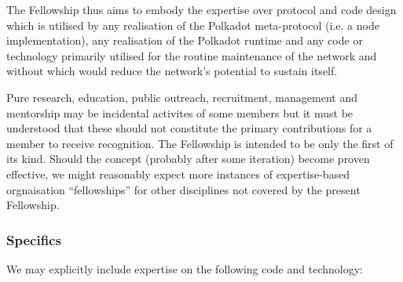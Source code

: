 \documentclass[9pt,oneside]{amsart}
\makeatletter
\newcommand*\ie{i.e.\@\xspace}
\makeatother
\begin{document}
The Fellowship thus aims to embody the expertise over protocol and code design which is utilised by any realisation of the Polkadot meta-protocol (\ie a node implementation), any realisation of the Polkadot runtime and any code or technology primarily utilised for the routine maintenance of the network and without which would reduce the network's potential to sustain itself.

Pure research, education, public outreach, recruitment, management and mentorship may be incidental activites of some members but it must be understood that these should not constitute the primary contributions for a member to receive recognition. The Fellowship is intended to be only the first of its kind. Should the concept (probably after some iteration) become proven effective, we might reasonably expect more instances of expertise-based orgnaisation ``fellowships'' for other disciplines not covered by the present Fellowship.

\subsubsection{Specifics}

We may explicitly include expertise on the following code and technology:
\end{document}
